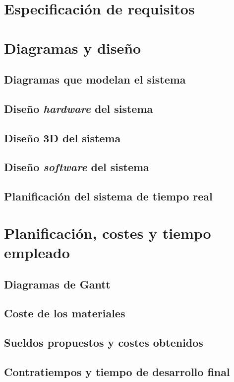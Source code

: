 \chapter{Especificación de requisitos}\label{chap:requirements}


\chapter{Diagramas y diseño}\label{chap:design}
\section{Diagramas que modelan el sistema}\label{sec:sys-diagrams}
\section{Diseño \textit{hardware} del sistema}\label{sec:hardware-design}
\section{Diseño 3D del sistema}\label{sec:3d-design}
\section{Diseño \textit{software} del sistema}\label{sec:software-design}
\section{Planificación del sistema de tiempo real}\label{sec:rt-design}

\chapter{Planificación, costes y tiempo empleado}\label{chap:planification}
\section{Diagramas de Gantt}
\section{Coste de los materiales}
\section{Sueldos propuestos y costes obtenidos}
\section{Contratiempos y tiempo de desarrollo final}

